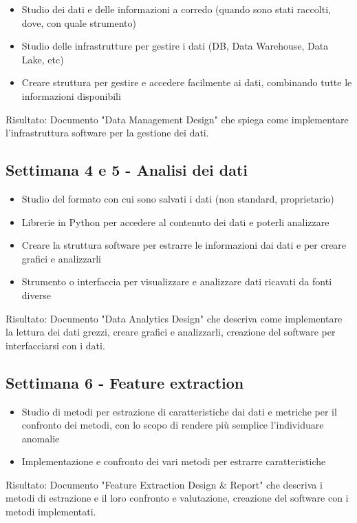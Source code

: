 \begin{itemize}
	\item Studio dei dati e delle informazioni a corredo (quando sono stati raccolti, dove, con quale strumento)
	\item Studio delle infrastrutture per gestire i dati (DB, Data Warehouse, Data Lake, etc)
	\item Creare struttura per gestire e  accedere facilmente ai dati, combinando tutte le informazioni disponibili
\end{itemize}
Risultato: Documento "Data Management Design" che spiega come implementare l'infrastruttura software per la gestione dei dati.

\subsection{Settimana 4 e 5 - Analisi dei dati}

\begin{itemize}
	\item Studio del formato con cui sono salvati i dati (non standard, proprietario)
	\item Librerie in Python per accedere al contenuto dei dati e poterli analizzare
	\item Creare la struttura software per estrarre le informazioni dai dati e per creare grafici e analizzarli
	\item Strumento o interfaccia per visualizzare e analizzare dati ricavati da fonti diverse
\end{itemize}
Risultato: Documento "Data Analytics Design" che descriva come implementare la lettura dei dati grezzi, creare grafici e analizzarli, creazione del software per interfacciarsi con i dati.

\subsection{Settimana 6 - Feature extraction}

\begin{itemize}
	\item Studio di metodi per estrazione di caratteristiche dai dati e metriche per il confronto dei metodi, con lo scopo di rendere più semplice l’individuare anomalie
	\item Implementazione e confronto dei vari metodi per estrarre caratteristiche
\end{itemize}
Risultato: Documento "Feature Extraction Design \& Report" che descriva i metodi di estrazione e il loro confronto e valutazione, creazione del software con i metodi implementati.

